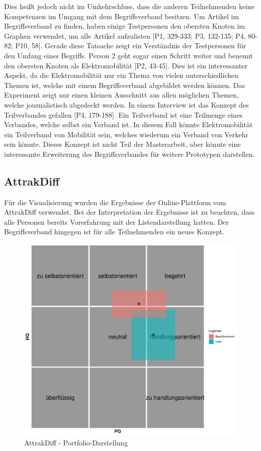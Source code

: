 Dies heißt jedoch nicht im Umkehrschluss, dass die anderen Teilnehmenden keine Kompetenzen im Umgang mit dem Begriffsverband besitzen.
Um Artikel im Begriffsverband zu finden, haben einige Testpersonen den obersten Knoten im Graphen verwendet, um alle Artikel aufzulisten [P1, 329-333; P3, 132-135; P4, 80-82; P10, 58].
Gerade diese Tatsache zeigt ein Verständnis der Testpersonen für den Umfang eines Begriffs.
Person 2 geht sogar einen Schritt weiter und benennt den obersten Knoten als Elektromobilität [P2, 43-45].
Dies ist ein interessanter Aspekt, da die Elektromobilität nur ein Thema von vielen unterschiedlichen Themen ist, welche mit einem Begriffsverband abgebildet werden können.
Das Experiment zeigt nur einen kleinen Ausschnitt aus allen möglichen Themen, welche journalistisch abgedeckt werden.
In einem Interview ist das Konzept des Teilverbandes gefallen [P4, 179-188].
Ein Teilverband ist eine Teilmenge eines Verbandes, welche selbst ein Verband ist.
In diesem Fall könnte Elektromobilität ein Teilverband von Mobilität sein, welches wiederum ein Verband von Verkehr sein könnte.
Dieses Konzept ist nicht Teil der Masterarbeit, aber könnte eine interessante Erweiterung des Begriffsverbandes für weitere Prototypen darstellen.

\subsection{AttrakDiff}
Für die Visualisierung wurden die Ergebnisse der Online-Plattform vom AttrakDiff verwendet.
Bei der Interpretation der Ergebnisse ist zu beachten, dass alle Personen bereits Vorerfahrung mit der Listendarstellung hatten.
Der Begriffsverband hingegen ist für alle Teilnehmenden ein neues Konzept.

\begin{figure}[!ht]
    \centering
    \includegraphics[width=0.7\columnwidth]{figures/attrakdiff-squares.pdf}
    \caption{\label{fig:attrakdiff-squares}AttrakDiff - Portfolio-Darstellung}
\end{figure}

